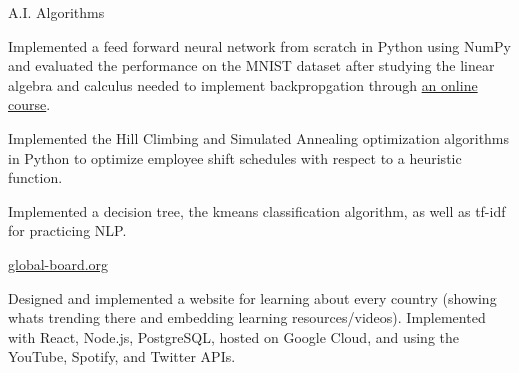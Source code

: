 
\begin{cventries}
  \cventry
    {} %
    {A.I. Algorithms} %
    {} %
    {} %
    {
      \begin{cvitems} %
      \item {Implemented a feed forward neural network from scratch in Python using NumPy and evaluated the performance on the MNIST dataset after studying the linear algebra and calculus needed to implement backpropgation through \href{http://neuralnetworksanddeeplearning.com/}{an online course}.}
      \item {Implemented the Hill Climbing and Simulated Annealing optimization algorithms in Python 
to optimize employee shift schedules with respect to a heuristic function.}
      \item {Implemented a decision tree, the kmeans classification algorithm, as well as tf-idf for practicing NLP.}
      \end{cvitems}
    }

  \cventry
    {} %
    {\href{https://global-board.org}{global-board.org}} %
    {} %
    {} %
    {
      \begin{cvitems} %
      \item {Designed and implemented a website for learning about every country (showing whats trending there and embedding learning resources/videos).  Implemented with React, Node.js, PostgreSQL, hosted on Google Cloud, and using the YouTube, Spotify, and Twitter APIs.}
      \end{cvitems}
    }
\end{cventries}
